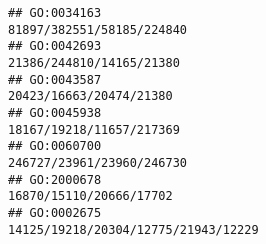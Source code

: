 \documentclass[
]{article}
\begin{document}
\begin{verbatim}
## GO:0034163                                                                                                                                                                                                                                                                                                                                                                                    81897/382551/58185/224840
## GO:0042693                                                                                                                                                                                                                                                                                                                                                                                     21386/244810/14165/21380
## GO:0043587                                                                                                                                                                                                                                                                                                                                                                                      20423/16663/20474/21380
## GO:0045938                                                                                                                                                                                                                                                                                                                                                                                     18167/19218/11657/217369
## GO:0060700                                                                                                                                                                                                                                                                                                                                                                                    246727/23961/23960/246730
## GO:2000678                                                                                                                                                                                                                                                                                                                                                                                      16870/15110/20666/17702
## GO:0002675                                                                                                                                                                                                                                                                                                                                                                          14125/19218/20304/12775/21943/12229

\end{verbatim}
\end{document}
